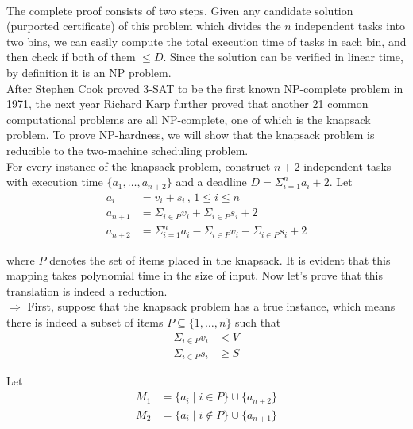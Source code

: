 \documentclass[11pt]{article}
\begin{document}
    \solution\\
    The complete proof consists of two steps. Given any candidate solution (purported certificate) of this problem which divides the $n$ independent tasks into two bins, we can easily compute the total execution time of tasks in each bin, and then check if both of them $\leq D$. Since the solution can be verified in linear time, by definition\autocite[1049]{Cormen09} it is an NP problem.\\

    After Stephen Cook proved 3-SAT to be the first known NP-complete problem in 1971\autocite{Cook71}, the next year Richard Karp further proved that another 21 common computational problems are all NP-complete\autocite{Karp72}, one of which is the knapsack problem. To prove NP-hardness, we will show that the knapsack problem is reducible to the two-machine scheduling problem.\\

    For every instance of the knapsack problem, construct $n + 2$ independent tasks with execution time $\{a_1, \dots, a_{n+2}\}$ and a deadline $D = \Sigma_{i=1}^{n} a_i + 2$. Let
    \begin{align*}
      a_i     &= v_i + s_i \,,\, 1 \le i \le n\\
      a_{n+1} &= \Sigma_{i \in P} v_i + \Sigma_{i \in P} s_i + 2\\
      a_{n+2} &= \Sigma_{i=1}^{n} a_i - \Sigma_{i \in P} v_i - \Sigma_{i \in P} s_i + 2
    \end{align*}

    where $P$ denotes the set of items placed in the knapsack. It is evident that this mapping takes polynomial time in the size of input. Now let's prove that this translation is indeed a reduction.\\

    $\Rightarrow$ First, suppose that the knapsack problem has a true instance, which means there is indeed a subset of items $P \subseteq \{1, \dots, n\}$ such that
    \begin{align*}
      \Sigma_{i \in P} v_i &< V\\
      \Sigma_{i \in P} s_i &\geq S
    \end{align*}

    Let
    \begin{align*}
      M_1 &= \{a_i \mid i \in P\} \cup \{a_{n+2}\}\\
      M_2 &= \{a_i \mid i \notin P\} \cup \{a_{n+1}\}
    \end{align*}
\end{document}
